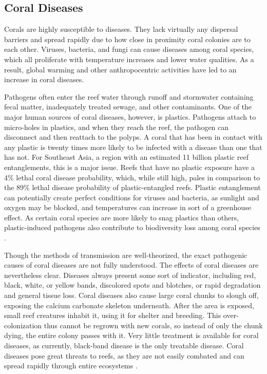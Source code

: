 \documentclass{book}\usepackage{knitr}
\begin{document}
\subsection{Coral Diseases}\label{sub:cd}

Corals are highly susceptible to diseases. They lack virtually any dispersal barriers and spread rapidly due to how close in proximity coral colonies are to each other. Viruses, bacteria, and fungi can cause diseases among coral species, which all proliferate with temperature increases and lower water qualities. As a result, global warming and other anthropocentric activities have led to an increase in coral diseases\citep{Keller2009ClimateCC}. 

Pathogens often enter the reef water through runoff and stormwater containing fecal matter, inadequately treated sewage, and other contaminants. One of the major human sources of coral diseases, however, is plastics. Pathogens attach to micro-holes in plastics, and when they reach the reef, the pathogen can disconnect and then reattach to the polyps. A coral that has been in contact with any plastic is twenty times more likely to be infected with a disease than one that has not. For Southeast Asia, a region with an estimated 11 billion plastic reef entanglements, this is a major issue. Reefs that have no plastic exposure have a 4\% lethal coral disease probability, which, while still high, pales in comparison to the 89\% lethal disease probability of plastic-entangled reefs. Plastic entanglement can potentially create perfect conditions for viruses and bacteria, as sunlight and oxygen may be blocked, and temperatures can increase in sort of a greenhouse effect. As certain coral species are more likely to snag plastics than others, plastic-induced pathogens also contribute to biodiversity loss among coral species \citep{Thompson}.

Though the methods of transmission are well-theorized, the exact pathogenic causes of coral diseases are not fully understood. The effects of coral diseases are nevertheless clear. Diseases always present some sort of indicator, including red, black, white, or yellow bands, discolored spots and blotches, or rapid degradation and general tissue loss. Coral diseases also cause large coral chunks to slough off, exposing the calcium carbonate skeleton underneath. After the area is exposed, small reef creatures inhabit it, using it for shelter and breeding. This over-colonization thus cannot be regrown with new corals, so instead of only the chunk dying, the entire colony passes with it. Very little treatment is available for coral diseases, as currently, black-band disease is the only treatable disease. Coral diseases pose great threats to reefs, as they are not easily combated and can spread rapidly through entire ecosystems \citep{coraldiseasenoaa}.
\end{document}
